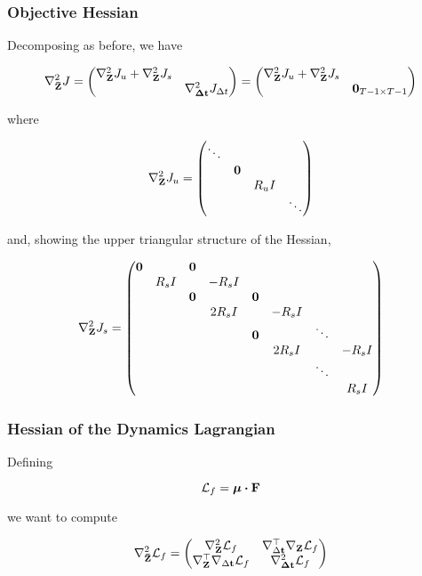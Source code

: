 \documentclass{article}
\begin{document}
\subsubsection*{Objective Hessian}

Decomposing as before, we have

$$
\nabla_{\vb{\bar Z}}^2 J = \mqty(
  \nabla_{\vb{Z}}^2 J_u + \nabla_{\vb{Z}}^2 J_s \\
  & \nabla_{\vb{\Delta \vb{t}}}^2 J_{\Delta t}
) = 
\mqty(
  \nabla_{\vb{Z}}^2 J_u + \nabla_{\vb{Z}}^2 J_s \\
  & \vb{0}_{T-1 \times T-1}
)
$$

where 

\begin{equation}
  \nabla_{\vb{Z}}^2 J_u = 
  \mqty(
    \ddots \\ 
    & \vb{0} \\
    & & R_u I \\  
    & & & \ddots \\ 
  )
\end{equation}

and, showing the upper triangular structure of the Hessian,

\begin{equation}
  \nabla_{\vb{Z}}^2 J_s =
  \mqty(
    \vb{0} & & \vb{0}\\
    & R_s I & &  -R_s I \\
    & & \vb{0} & & \vb{0}\\
    & & & 2 R_s I & & -R_s I \\ 
    & & & & \vb{0} & & \ddots \\
    & & & & & 2 R_s I & & -R_s I\\
    & & & & & & \ddots \\
    & & & & & & & R_s I \\
  )
\end{equation}


\subsubsection*{Hessian of the Dynamics Lagrangian}

Defining 

$$
\mathcal{L}_f = \vb*{\mu} \vdot \vb{F} 
$$

we want to compute

$$
\nabla_{\vb{\bar Z}}^2 \mathcal{L}_f = \mqty(
  \nabla_{\vb{Z}}^2 \mathcal{L}_f & 
  \nabla^\top_{\Delta \vb{t}} \nabla_{\vb{Z}} \mathcal{L}_f \\
  \nabla^\top_{\vb{Z}} \nabla_{\Delta \vb{t}} \mathcal{L}_f & 
  \nabla_{\vb{\Delta \vb{t}}}^2 \mathcal{L}_f
)
$$
\end{document}
